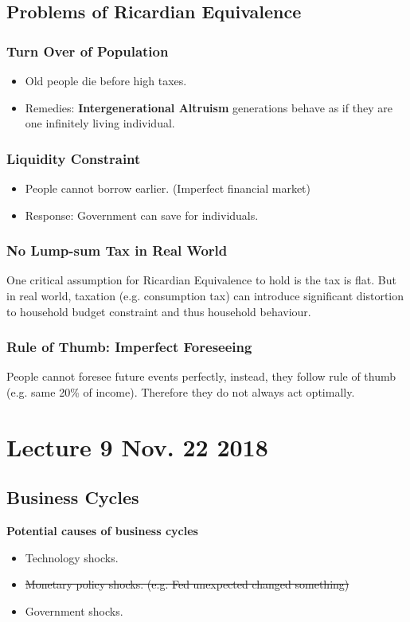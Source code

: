 \documentclass[11pt]{article}
\begin{document}
		\subsection{Problems of Ricardian Equivalence}
			\subsubsection{Turn Over of Population}
				\begin{itemize}
					\item Old people die before high taxes.
					\item Remedies: \textbf{Intergenerational Altruism} generations behave as if they are one infinitely living individual.
				\end{itemize}
				
			\subsubsection{Liquidity Constraint}
				\begin{itemize}
					\item People cannot borrow earlier. (Imperfect financial market)
					\item Response: Government can save for individuals.
				\end{itemize}
			
			\subsubsection{No Lump-sum Tax in Real World}
				\par One critical assumption for Ricardian Equivalence to hold is the tax is flat. But in real world, taxation (e.g. consumption tax) can introduce significant distortion to household budget constraint and thus household behaviour.
				
			\subsubsection{Rule of Thumb: Imperfect Foreseeing}
				\par People cannot foresee future events perfectly, instead, they follow rule of thumb (e.g. same 20\% of income). Therefore they do not always act optimally.
				
	\section{Lecture 9 Nov. 22 2018}
		\subsection*{Business Cycles}
			\par \textbf{Potential causes of business cycles}
			\begin{itemize}
				\item Technology shocks.
				\item \st{Monetary policy shocks. (e.g. Fed unexpected changed something)}
				\item Government shocks.
			\end{itemize}
\end{document}
